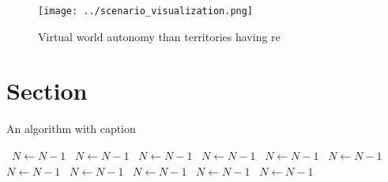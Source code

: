 \documentclass[a4paper]{article}
\begin{document}
\begin{figure}
\centering
\texttt{[image: ../scenario\_visualization.png]}
\caption{Virtual world autonomy than territories having re
}
\end{figure}
 
\section{Section}

\begin{algorithm}
\caption{An algorithm with caption}
\begin{algorithmic}
\    \State $N \gets N - 1$
\    \State $N \gets N - 1$
\    \State $N \gets N - 1$
\    \State $N \gets N - 1$
\    \State $N \gets N - 1$
\    \State $N \gets N - 1$
\    \State $N \gets N - 1$
\    \State $N \gets N - 1$
\    \State $N \gets N - 1$
\    \State $N \gets N - 1$
\    \State $N \gets N - 1$
\EndWhile
\end{algorithmic}
\end{algorithm}
\end{document}
